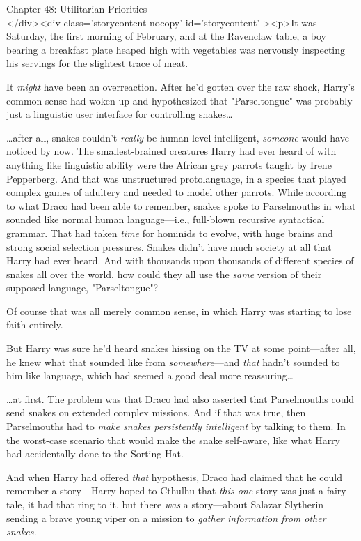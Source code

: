 
Chapter 48: Utilitarian Priorities\\
</div><div  class='storycontent nocopy' id='storycontent' ><p>It was Saturday, 
the first morning of February, and at the Ravenclaw table, a boy bearing a 
breakfast plate heaped high with vegetables was nervously inspecting his 
servings for the slightest trace of meat.

It \emph{might} have been an overreaction. After he'd gotten over the raw 
shock, Harry's common sense had woken up and hypothesized that "Parseltongue" 
was probably just a linguistic user interface for controlling snakes{\ldots}

{\ldots}after all, snakes couldn't \emph{really} be human-level intelligent, 
\emph{someone} would have noticed by now. The smallest-brained creatures Harry 
had ever heard of with anything like linguistic ability were the African grey 
parrots taught by Irene Pepperberg. And that was unstructured protolanguage, in 
a species that played complex games of adultery and needed to model other 
parrots. While according to what Draco had been able to remember, snakes spoke 
to Parselmouths in what sounded like normal human language---i.e., full-blown 
recursive syntactical grammar. That had taken \emph{time} for hominids to 
evolve, with huge brains and strong social selection pressures. Snakes didn't 
have much society at all that Harry had ever heard. And with thousands upon 
thousands of different species of snakes all over the world, how could they all 
use the \emph{same} version of their supposed language, "Parseltongue"?

Of course that was all merely common sense, in which Harry was starting to lose 
faith entirely.

But Harry was sure he'd heard snakes hissing on the TV at some point---after 
all, he knew what that sounded like from \emph{somewhere}---and \emph{that} 
hadn't sounded to him like language, which had seemed a good deal more 
reassuring{\ldots}

{\ldots}at first. The problem was that Draco had also asserted that 
Parselmouths could send snakes on extended complex missions. And if that was 
true, then Parselmouths had to \emph{make snakes persistently intelligent} by 
talking to them. In the worst-case scenario that would make the snake 
self-aware, like what Harry had accidentally done to the Sorting Hat.

And when Harry had offered \emph{that} hypothesis, Draco had claimed that he 
could remember a story---Harry hoped to Cthulhu that \emph{this one} story was 
just a fairy tale, it had that ring to it, but there \emph{was} a story---about 
Salazar Slytherin sending a brave young viper on a mission to \emph{gather 
information from other snakes.}

